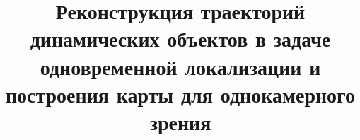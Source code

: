 \documentclass[conference]{IEEEtran}
\begin{document}
%
\title{Реконструкция траекторий динамических объектов в задаче одновременной локализации и построения карты для однокамерного зрения}

\author{
\and
{}
}


% 








\maketitle
\end{document}
